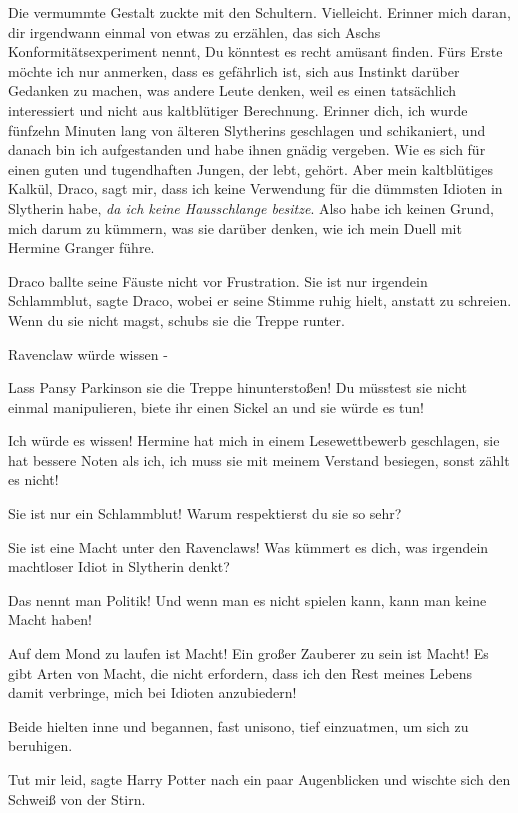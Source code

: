 Die vermummte Gestalt zuckte mit den Schultern. \glqq Vielleicht. Erinner mich
daran, dir irgendwann einmal von etwas zu erzählen, das sich Aschs
Konformitätsexperiment nennt, Du könntest es recht amüsant finden. Fürs Erste
möchte ich nur anmerken, dass es gefährlich ist, sich aus Instinkt darüber
Gedanken zu machen, was andere Leute denken, weil es einen tatsächlich
interessiert und nicht aus kaltblütiger Berechnung. Erinner dich, ich wurde
fünfzehn Minuten lang von älteren Slytherins geschlagen und schikaniert, und
danach bin ich aufgestanden und habe ihnen gnädig vergeben. Wie es sich für
einen guten und tugendhaften Jungen, der lebt, gehört. Aber mein kaltblütiges
Kalkül, Draco, sagt mir, dass ich keine Verwendung für die dümmsten Idioten in
Slytherin habe, \emph{da ich keine Hausschlange besitze}. Also habe ich keinen
Grund, mich darum zu kümmern, was sie darüber denken, wie ich mein Duell mit
Hermine Granger führe.\grqq{}

Draco ballte seine Fäuste nicht vor Frustration. \glqq Sie ist nur irgendein
Schlammblut\grqq{}, sagte Draco, wobei er seine Stimme ruhig hielt, anstatt zu
schreien. \glqq Wenn du sie nicht magst, schubs sie die Treppe runter.\grqq{}

\glqq Ravenclaw würde wissen -\grqq{}

\glqq Lass Pansy Parkinson sie die Treppe hinunterstoßen! Du müsstest sie nicht
einmal manipulieren, biete ihr einen Sickel an und sie würde es tun!\grqq{}

\glqq Ich würde es wissen! Hermine hat mich in einem Lesewettbewerb geschlagen,
sie hat bessere Noten als ich, ich muss sie mit meinem Verstand besiegen, sonst
zählt es nicht!\grqq{}

\glqq Sie ist nur ein Schlammblut! Warum respektierst du sie so sehr?\grqq{}

\glqq Sie ist eine Macht unter den Ravenclaws! Was kümmert es dich, was
irgendein machtloser Idiot in Slytherin denkt?\grqq{}

\glqq Das nennt man Politik! Und wenn man es nicht spielen kann, kann man keine
Macht haben!\grqq{}

\glqq Auf dem Mond zu laufen ist Macht! Ein großer Zauberer zu sein ist Macht!
Es gibt Arten von Macht, die nicht erfordern, dass ich den Rest meines Lebens
damit verbringe, mich bei Idioten anzubiedern!\grqq{}

Beide hielten inne und begannen, fast unisono, tief einzuatmen, um sich zu
beruhigen.

\glqq Tut mir leid\grqq{}, sagte Harry Potter nach ein paar Augenblicken und
wischte sich den Schweiß von der Stirn.

